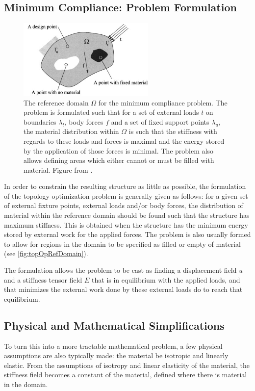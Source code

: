 \subsection{Minimum Compliance: Problem Formulation}
\label{subsec:TopOpTheory}
\begin{figure}
\centering
\includegraphics[width=0.6\textwidth]{Pictures/TopOp/design_domain.png}
\caption{The reference domain $\Omega$ for the minimum compliance problem. The problem is formulated such that for a set of external loads $t$ on boundaries $\lambda_t$, body forces $f$ and a set of fixed support points $\lambda_u$, the material distribution within $\Omega$ is such that the stiffness with regards to these loads and forces is maximal and the energy stored by the application of those forces is minimal. The problem also allows defining areas which either cannot or must be filled with material. Figure from \cite{bendsoe2003topology}.}
\label{fig:topOpRefDomain}
\end{figure}
In order to constrain the resulting structure as little as possible, the formulation of the topology optimization problem is generally given as follows: for a given set of external fixture points, external loads and/or body forces, the distribution of material within the reference domain should be found such that the structure has maximum stiffness. This is obtained when the structure has the minimum energy stored by external work for the applied forces. The problem is also usually formed to allow for regions in the domain to be specified as filled or empty of material (see \autoref{fig:topOpRefDomain}). 

The formulation allows the problem to be cast as finding a displacement field $u$ and a stiffness tensor field $E$ that is in equilibrium with the applied loads, and that minimizes the external work done by these external loads do to reach that equilibrium. 

\subsection{Physical and Mathematical Simplifications}
To turn this into a more tractable mathematical problem, a few physical assumptions are also typically made: the material be isotropic and linearly elastic. From the assumptions of isotropy and linear elasticity of the material, the stiffness field becomes a constant of the material, defined where there is material in the domain.

